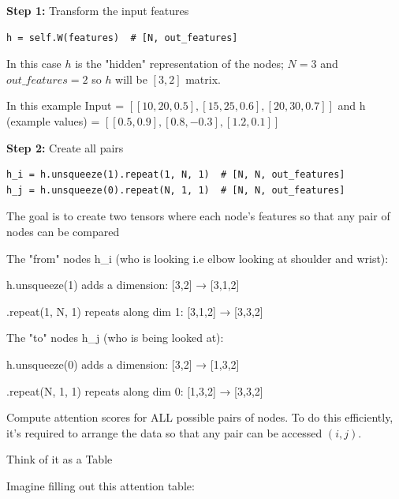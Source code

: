 \textbf{Step 1:} Transform the input features

\begin{lstlisting}[style=pythonstyle,title={Toy problem forward pass step 1},label={code:toy_problem_forward_pass_step_1}]
h = self.W(features)  # [N, out_features]
\end{lstlisting}

In this case $h$ is the "hidden" representation of the nodes; $N=3$ and $out\_features=2$ so $h$ will be $[3, 2]$ matrix.

In this example Input = $[[10, 20, 0.5], [15, 25, 0.6], [20, 30, 0.7]]$ and h
(example values) = $[[0.5, 0.9], [0.8, -0.3], [1.2, 0.1]]$

\textbf{Step 2:} Create all pairs 

\begin{lstlisting}[style=pythonstyle,title={Toy problem forward pass step 2},label={code:toy_problem_forward_pass_step_2}]
h_i = h.unsqueeze(1).repeat(1, N, 1)  # [N, N, out_features]
h_j = h.unsqueeze(0).repeat(N, 1, 1)  # [N, N, out_features]
\end{lstlisting}

The goal is to create two tensors where each node's features so that any pair of nodes can be compared

The "from" nodes h\_i (who is looking i.e elbow looking at shoulder and wrist):

\begin{compactitem}
   \item h.unsqueeze(1) adds a dimension: [3,2] → [3,1,2]
   \item .repeat(1, N, 1) repeats along dim 1: [3,1,2] → [3,3,2] 
\end{compactitem}

The "to" nodes h\_j (who is being looked at):

\begin{compactitem}
   \item h.unsqueeze(0) adds a dimension: [3,2] → [1,3,2]
   \item .repeat(N, 1, 1) repeats along dim 0: [1,3,2] → [3,3,2]
\end{compactitem}

Compute attention scores for ALL possible pairs of nodes. To do this
efficiently, it's required to arrange the data so that any pair can be accessed $(i,j)$.

Think of it as a Table

Imagine filling out this attention table:

